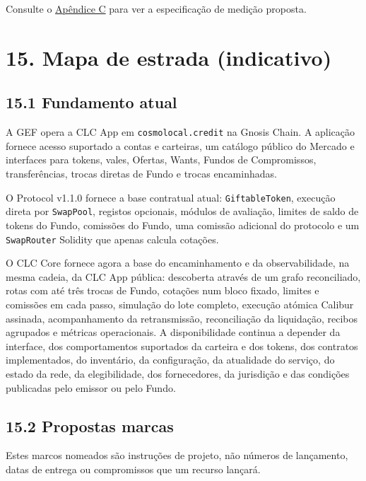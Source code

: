 \documentclass[11pt]{article}
\begin{document}
Consulte o \href{https://docs.cosmolocal.credit/pt/white-paper/appendix-c-kpi-definitions}{Apêndice C} para ver a especificação de medição proposta.


\section*{15. Mapa de estrada (indicativo)}

\subsection*{15.1 Fundamento atual}

A GEF opera a CLC App em \texttt{cosmolocal.credit} na Gnosis Chain. A aplicação fornece acesso suportado a contas e carteiras, um catálogo público do Mercado e interfaces para tokens, vales, Ofertas, Wants, Fundos de Compromissos, transferências, trocas diretas de Fundo e trocas encaminhadas.

O Protocol v1.1.0 fornece a base contratual atual: \texttt{GiftableToken}, execução direta por \texttt{SwapPool}, registos opcionais, módulos de avaliação, limites de saldo de tokens do Fundo, comissões do Fundo, uma comissão adicional do protocolo e um \texttt{SwapRouter} Solidity que apenas calcula cotações.

O CLC Core fornece agora a base do encaminhamento e da observabilidade, na mesma cadeia, da CLC App pública: descoberta através de um grafo reconciliado, rotas com até três trocas de Fundo, cotações num bloco fixado, limites e comissões em cada passo, simulação do lote completo, execução atómica Calibur assinada, acompanhamento da retransmissão, reconciliação da liquidação, recibos agrupados e métricas operacionais. A disponibilidade continua a depender da interface, dos comportamentos suportados da carteira e dos tokens, dos contratos implementados, do inventário, da configuração, da atualidade do serviço, do estado da rede, da elegibilidade, dos fornecedores, da jurisdição e das condições publicadas pelo emissor ou pelo Fundo.

\subsection*{15.2 Propostas marcas}

Estes marcos nomeados são instruções de projeto, não números de lançamento, datas de entrega ou compromissos que um recurso lançará.
\end{document}
